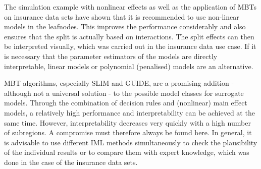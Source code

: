 The simulation example with nonlinear effects as well as the application of MBTs on insurance data sets have shown that it is recommended to use non-linear models in the leafnodes. This improves the performance considerably and also ensures that the split is actually based on interactions.
The split effects can then be interpreted visually, which was carried out in the insurance data use case.
If it is necessary that the parameter estimators of the models are directly interpretable, linear models or polynomial (penalised) models are an alternative.


MBT algorithms, especially SLIM and GUIDE, are a promising addition - although not a universal solution - to the possible model classes for surrogate models. Through the combination of decision rules and (nonlinear) main effect models, a relatively high performance and interpretability can be achieved at the same time. However, interpretability decreases very quickly with a high number of subregions. A compromise must therefore always be found here. In general, it is advisable to use different IML methods simultaneously to check the plausibility of the individual results or to compare them with expert knowledge, which was done in the case of the insurance data sets.

